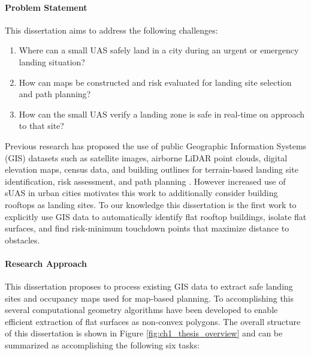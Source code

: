 \paragraph{Problem Statement}

This dissertation aims to address the following challenges:

\begin{enumerate}[noitemsep]
    \itemsep0em 
    \item Where can a small UAS safely land in a city during an urgent or emergency landing situation?
    \item How can maps be constructed and risk evaluated for landing site selection and path planning?
    \item How can the small UAS verify a landing zone is safe in real-time on approach to that site?
\end{enumerate}

Previous research has proposed the use of public Geographic Information Systems (GIS) datasets such as satellite images, airborne LiDAR point clouds, digital elevation maps, census data, and building outlines for terrain-based landing site identification, risk assessment, and path planning \cite{meuleau_emergency_2009, di_donato_evaluating_2017, patterson_timely_2014, bleier_risk_2015}.  However increased use of sUAS in urban cities motivates this work to additionally consider building rooftops as landing sites. To our knowledge this dissertation is the first work to explicitly use GIS data to automatically identify flat rooftop buildings, isolate flat surfaces, and find risk-minimum touchdown points that maximize distance to obstacles. 

\paragraph{Research Approach}


This dissertation proposes to process existing GIS data to extract safe landing sites and occupancy maps used for map-based planning. To accomplishing this several computational geometry algorithms have been developed to enable efficient extraction of flat surfaces as non-convex polygons. The overall structure of this dissertation is shown in Figure \ref{fig:ch1_thesis_overview} and can be summarized as accomplishing the following six tasks:

